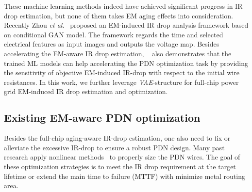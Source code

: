 These machine learning methods indeed have achieved significant progress in IR drop estimation, but none of them takes EM aging effects into consideration. Recently Zhou {\it et al.}~\cite{ZhouJin:ICCAD'20} proposed an EM-induced IR drop analysis framework based on conditional GAN model. The framework regards the time and selected electrical features as input images and outputs the voltage map. 
Besides accelerating the EM-aware IR drop estimation, ~\cite{ZhouJin:ICCAD'20} also demonstrates that the trained ML models can help accelerating the PDN optimization task by providing the sensitivity of objective EM-induced IR-drop with respect to the initial wire resistances. 
In this work, we further leverage {\it VAE}-structure for full-chip power grid EM-induced IR drop estimation and optimization.


\subsection{Existing EM-aware PDN optimization}
 \label{subsec:exist_pgfix}
 Besides the full-chip aging-aware IR-drop estimation, one also need to fix or alleviate the excessive IR-drop to ensure a robust PDN design. Many past research apply nonlinear methods~\cite{ChBr:TCAD'88,DuMa:DAC'89,Tan:DAC'99,Wang:TCAD'05,ZhouSun:TVLSI'19, Sukharev:2019pg} to properly size the PDN wires. The goal of these optimization strategies is to meet the IR drop requirement at the target lifetime or extend the main time to failure (MTTF) with minimize metal routing area.
 
